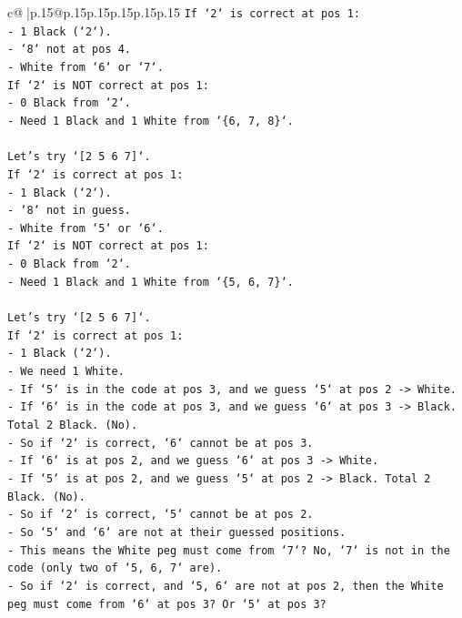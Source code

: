 \documentclass{article}
\begin{document}
{\begin{supertabular}{c@{$\;$}|p{.15\linewidth}@{}p{.15\linewidth}p{.15\linewidth}p{.15\linewidth}p{.15\linewidth}p{.15\linewidth}}
{{{\texttt{If `2` is correct at pos 1:} \\
\texttt{{-} 1 Black (`2`).} \\
\texttt{{-} `8` not at pos 4.} \\
\texttt{{-} White from `6` or `7`.} \\
\texttt{If `2` is NOT correct at pos 1:} \\
\texttt{{-} 0 Black from `2`.} \\
\texttt{{-} Need 1 Black and 1 White from `\{6, 7, 8\}`.} \\
\\ 
\texttt{Let's try `{[}2 5 6 7{]}`.} \\
\texttt{If `2` is correct at pos 1:} \\
\texttt{{-} 1 Black (`2`).} \\
\texttt{{-} `8` not in guess.} \\
\texttt{{-} White from `5` or `6`.} \\
\texttt{If `2` is NOT correct at pos 1:} \\
\texttt{{-} 0 Black from `2`.} \\
\texttt{{-} Need 1 Black and 1 White from `\{5, 6, 7\}`.} \\
\\ 
\texttt{Let's try `{[}2 5 6 7{]}`.} \\
\texttt{If `2` is correct at pos 1:} \\
\texttt{{-} 1 Black (`2`).} \\
\texttt{{-} We need 1 White.} \\
\texttt{{-} If `5` is in the code at pos 3, and we guess `5` at pos 2 {-}> White.} \\
\texttt{{-} If `6` is in the code at pos 3, and we guess `6` at pos 3 {-}> Black. Total 2 Black. (No).} \\
\texttt{{-} So if `2` is correct, `6` cannot be at pos 3.} \\
\texttt{{-} If `6` is at pos 2, and we guess `6` at pos 3 {-}> White.} \\
\texttt{{-} If `5` is at pos 2, and we guess `5` at pos 2 {-}> Black. Total 2 Black. (No).} \\
\texttt{{-} So if `2` is correct, `5` cannot be at pos 2.} \\
\texttt{{-} So `5` and `6` are not at their guessed positions.} \\
\texttt{{-} This means the White peg must come from `7`? No, `7` is not in the code (only two of `5, 6, 7` are).} \\
\texttt{{-} So if `2` is correct, and `5, 6` are not at pos 2, then the White peg must come from `6` at pos 3? Or `5` at pos 3?} \\
}}}
\end{supertabular}}
\end{document}
